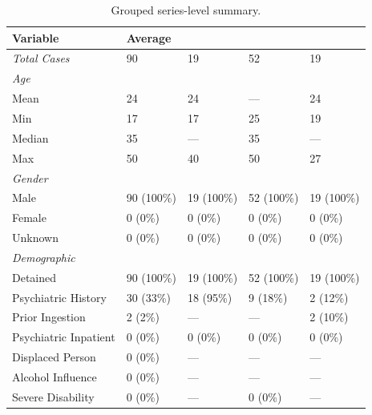\begin{table}
\caption{Grouped series-level summary.}
\label{tab:series_results}
\centering
\renewcommand{\arraystretch}{1}
\small
\begin{tabular}{p{10cm} p{3cm} p{3cm} p{3cm} p{3cm}}
\toprule
\textbf{Variable} & \textbf{Average} & \textbf{\citet{Karp_1991b}} & \textbf{\citet{Lee_2007}} & \textbf{\citet{Elghali_2016}} \\
\midrule
\multicolumn{1}{l}{\textit{Total Cases}} & 90 & 19 & 52 & 19 \\
\textit{Age} & & & & \\
\hspace{1em}Mean & 24 & 24 & --- & 24 \\
\hspace{1em}Min & 17 & 17 & 25 & 19 \\
\hspace{1em}Median & 35 & --- & 35 & --- \\
\hspace{1em}Max & 50 & 40 & 50 & 27 \\
\textit{Gender} & & & & \\
\hspace{1em}Male & 90 (100\%) & 19 (100\%) & 52 (100\%) & 19 (100\%) \\
\hspace{1em}Female & 0 (0\%) & 0 (0\%) & 0 (0\%) & 0 (0\%) \\
\hspace{1em}Unknown & 0 (0\%) & 0 (0\%) & 0 (0\%) & 0 (0\%) \\
\textit{Demographic} & & & & \\
\hspace{1em}Detained & 90 (100\%) & 19 (100\%) & 52 (100\%) & 19 (100\%) \\
\hspace{1em}Psychiatric History & 30 (33\%) & 18 (95\%) & 9 (18\%) & 2 (12\%) \\
\hspace{1em}Prior Ingestion & 2 (2\%) & --- & --- & 2 (10\%) \\
\hspace{1em}Psychiatric Inpatient & 0 (0\%) & 0 (0\%) & 0 (0\%) & 0 (0\%) \\
\hspace{1em}Displaced Person & 0 (0\%) & --- & --- & --- \\
\hspace{1em}Alcohol Influence & 0 (0\%) & --- & --- & --- \\
\hspace{1em}Severe Disability & 0 (0\%) & --- & 0 (0\%) & --- \\

\end{tabular}
\end{table}
